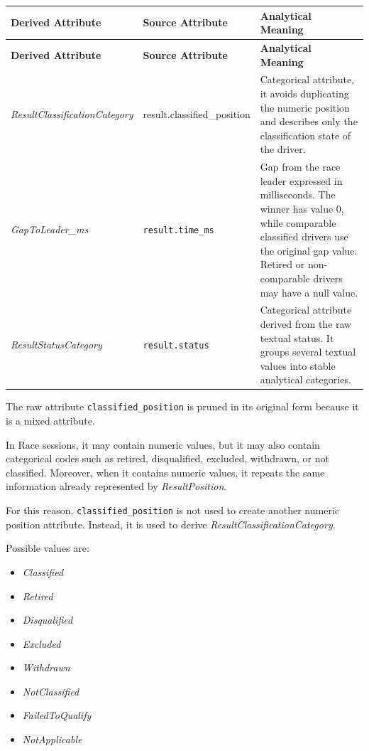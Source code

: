 \documentclass[a4paper,11pt]{article}
\begin{document}
	\begin{longtable}{|p{4.5cm}|p{4.2cm}|p{6.2cm}|}
		\hline
		\textbf{Derived Attribute} & \textbf{Source Attribute} & \textbf{Analytical Meaning} \\
		\hline
		\endfirsthead
		
		\hline
		\textbf{Derived Attribute} & \textbf{Source Attribute} & \textbf{Analytical Meaning} \\
		\hline
		\endhead
		

		\textit{ResultClassificationCategory}
		& result.classified\_position
		& Categorical attribute, it avoids duplicating the numeric position and describes only the classification state of the driver. \\
		\hline
		
		\textit{GapToLeader\_ms}
		& \texttt{result.time\_ms}
		& Gap from the race leader expressed in milliseconds. The winner has value 0, while comparable classified drivers use the original gap value. Retired or non-comparable drivers may have a null value. \\
		\hline
		
		\textit{ResultStatusCategory}
		& \texttt{result.status}
		& Categorical attribute derived from the raw textual status. It groups several textual values into stable analytical categories. \\
		\hline
	\end{longtable}
	
	
	The raw attribute \texttt{classified\_position} is pruned in its original form because it is
	a mixed attribute.
	
	In Race sessions, it may contain numeric values, but it may also contain categorical
	codes such as retired, disqualified, excluded, withdrawn, or not classified. Moreover, when
	it contains numeric values, it repeats the same information already represented by
	\textit{ResultPosition}.
	
	For this reason, \texttt{classified\_position} is not used to create another numeric
	position attribute. Instead, it is used to derive \textit{ResultClassificationCategory}.
	
	Possible values are:
	
	\begin{itemize}
		\item \textit{Classified}
		\item \textit{Retired}
		\item \textit{Disqualified}
		\item \textit{Excluded}
		\item \textit{Withdrawn}
		\item \textit{NotClassified}
		\item \textit{FailedToQualify}
		\item \textit{NotApplicable}
	\end{itemize}
	
\end{document}
